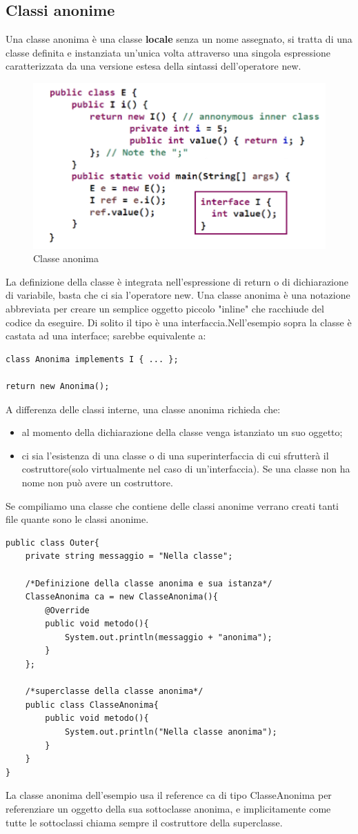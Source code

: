 \subsection{Classi anonime}
Una classe anonima è una classe \textbf{locale} senza un nome assegnato, si tratta di una classe definita e instanziata un’unica volta attraverso una singola espressione caratterizzata da una versione estesa della sintassi dell’operatore new.
\begin{figure}[H]
\centering
\includegraphics{images/anonime1}
\caption{Classe anonima\label{fig:UC3}}
\end{figure}
La definizione della classe è integrata nell’espressione di return o di dichiarazione di variabile, basta che ci sia l'operatore new. Una classe anonima è una notazione abbreviata per creare un semplice oggetto piccolo "inline" che racchiude del codice da eseguire. Di solito il tipo è una interfaccia.Nell’esempio sopra la classe è castata ad una interface; sarebbe equivalente a:
\begin{lstlisting}
class Anonima implements I { ... }; 

return new Anonima();
\end{lstlisting}
A differenza delle classi interne, una classe anonima richieda che:
\begin{itemize}
	\item al momento della dichiarazione della classe venga istanziato un suo oggetto;
	\item ci sia l'esistenza di una classe o di una superinterfaccia di cui sfrutterà il costruttore(solo virtualmente nel caso di un'interfaccia). Se una classe non ha nome non può avere un costruttore.
\end{itemize}
Se compiliamo una classe che contiene delle classi anonime verrano creati tanti file quante sono le classi anonime.
\begin{lstlisting}
public class Outer{
	private string messaggio = "Nella classe";

	/*Definizione della classe anonima e sua istanza*/
	ClasseAnonima ca = new ClasseAnonima(){
		@Override
		public void metodo(){
			System.out.println(messaggio + "anonima");
		}
	};

	/*superclasse della classe anonima*/
	public class ClasseAnonima{
		public void metodo(){
			System.out.println("Nella classe anonima");
		}
	}
}
\end{lstlisting}
La classe anonima dell'esempio usa il reference ca di tipo ClasseAnonima per referenziare un oggetto della sua sottoclasse anonima, e implicitamente come tutte le sottoclassi chiama sempre il costruttore della superclasse.

